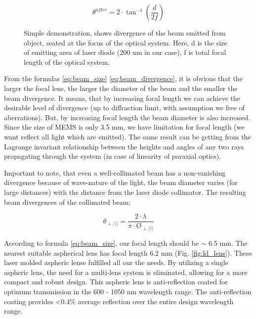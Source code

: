 \begin{figure}[H]
\begin{minipage}[h]{0.52\linewidth}
\end{minipage}
\hfill
\begin{minipage}[h]{0.45\linewidth}
\begin{equation}\label{eq:beam_divergence}
\theta^{after} = 2 \cdot \tan^{-1}{(\frac{d}{2f})}
\end{equation}
\end{minipage}
\caption{
Simple demonstration, shows divergence of the beam emitted from object, seated at the focus of the optical system. Here, d is the size of emitting area of laser diode (200 um in our case), f is total focal length of the optical system.
}
\label{fig:lens}
\end{figure}





From the formulas \ref{eq:beam_size} \ref{eq:beam_divergence}, it is obvious that the larger the focal lens, the larger the diameter of the beam and the smaller the beam divergence. It means, that by increasing focal length we can achieve the desirable level of divergence (up to diffraction limit, with assumption we free of aberrations). But, by increasing focal length the beam diameter is also increased.
Since the size of MEMS is only 3.5 mm, we have limitation for focal length (we want reflect all light which are emitted).
The same result can be getting from the Lagrange invariant relationship between the heights and angles of any two rays propagating through the system (in case of linearity of paraxial optics).

Important to note, that even a well-collimated beam has a non-vanishing divergence because of wave-nature of the light, the beam diameter varies (for large distances) with the distance from the laser diode collimator. The resulting beam divergences of the collimated beam:



\begin{equation}\label{eq:beam_divergence}
\theta_{\perp/||} = \frac{2\cdot \lambda}{\pi \cdot \text{\O}_{\perp/||}}
\end{equation}


According to formula \ref{eq:beam_size}, our focal length should be $\sim$ 6.5 mm.
The nearest suitable aspherical lens has focal length 6.2 mm (Fig. \ref{fig:ld_lens}).
These laser molded aspheric lense fulfilled all our the needs. By utilizing a single aspheric lens, the need for a multi-lens system is eliminated, allowing for a more compact and robust design. This aspheric lens is anti-reflection coated for optimum transmission in the 600 - 1050 nm wavelength range. The anti-reflection coating provides <0.4\% average reflection over the entire design wavelength range.


